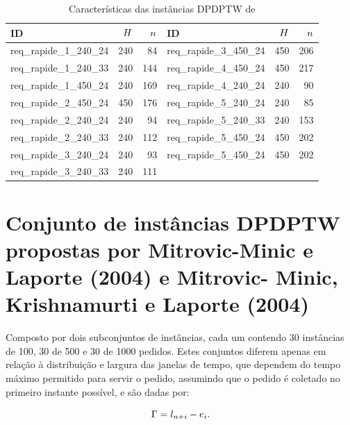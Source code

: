 \begin{table}[h]
\footnotesize
    \caption{Características das instâncias DPDPTW de 
             \textcite{gendreau_neighborhood_2006}}
    \label{tab:gendreau2006_instances_characteristics}
    \centering
    \begin{tabular}{lrr|lrr}
        \toprule
         ID & $H$ & $n$ & 
         ID & $H$ & $n$ \\
         \midrule
         req\_rapide\_1\_240\_24 & 240 &  84 & 
         req\_rapide\_3\_450\_24 & 450 & 206 \\ 
         req\_rapide\_1\_240\_33 & 240 & 144 & 
         req\_rapide\_4\_450\_24 & 450 & 217 \\
         req\_rapide\_1\_450\_24 & 240 & 169 & 
         req\_rapide\_4\_240\_24 & 240 &  90 \\ 
         req\_rapide\_2\_450\_24 & 450 & 176 &
         req\_rapide\_5\_240\_24 & 240 &  85 \\
         req\_rapide\_2\_240\_24 & 240 &  94 &
         req\_rapide\_5\_240\_33 & 240 & 153 \\
         req\_rapide\_2\_240\_33 & 240 & 112 &
         req\_rapide\_5\_450\_24 & 450 & 202 \\
         req\_rapide\_3\_240\_24 & 240 &  93 &
         req\_rapide\_5\_450\_24 & 450 & 202 \\
         req\_rapide\_3\_240\_33 & 240 & 111 &
                                 &     &     \\
         \bottomrule
  \end{tabular}
\end{table}





\section{Conjunto de instâncias DPDPTW propostas por 
         Mitrovic-Minic e Laporte (2004) e Mitrovic-
         Minic, Krishnamurti e Laporte (2004)}

Composto por dois subconjuntos de instâncias, cada um contendo 30 instâncias de 
100, 30 de 500 e 30 de 1000 pedidos.
Estes conjuntos diferem apenas em relação à distribuição e largura das 
janelas de tempo, que dependem do tempo máximo permitido para servir o pedido, 
assumindo que o pedido é coletado no primeiro instante possível, e são dadas 
por:

\begin{equation}
    \Gamma = l_{n + i}
              - e_i.
    \label{eq: mitrovic_maximal_time_allowed}
\end{equation}


